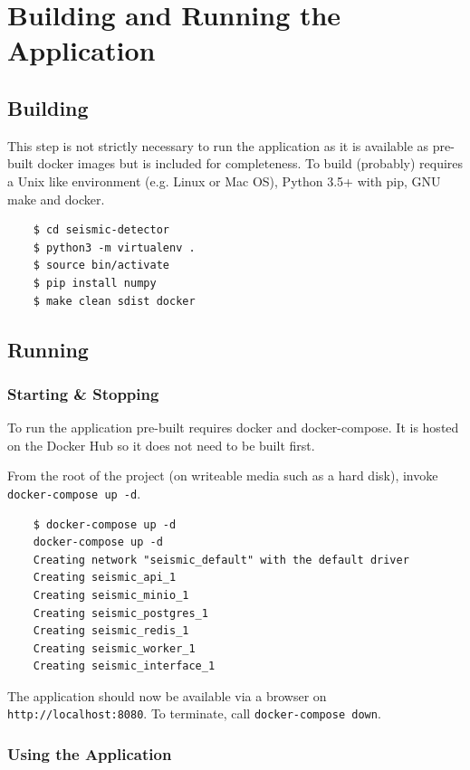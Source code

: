 \documentclass[../report.tex]{subfiles}
\begin{document}
\section{Building and Running the Application}
\subsection{Building}

	This step is not strictly necessary to run the application as it is available as pre-built docker images but is included for completeness.  To build (probably) requires a Unix like environment (e.g. Linux or Mac OS), Python 3.5+ with pip, GNU make and docker.
	
\begin{verbatim}
	$ cd seismic-detector
	$ python3 -m virtualenv .
	$ source bin/activate
	$ pip install numpy
	$ make clean sdist docker
\end{verbatim}

\subsection{Running}

\subsubsection{Starting \& Stopping} \label{sec:start-stop}

	To run the application pre-built requires docker and docker-compose.  It is hosted on the Docker Hub so it does not need to be built first.
	
	From the root of the project (on writeable media such as a hard disk), invoke \texttt{docker-compose up -d}.
	
\begin{verbatim}
	$ docker-compose up -d
	docker-compose up -d
	Creating network "seismic_default" with the default driver
	Creating seismic_api_1
	Creating seismic_minio_1
	Creating seismic_postgres_1
	Creating seismic_redis_1
	Creating seismic_worker_1
	Creating seismic_interface_1
\end{verbatim}

	The application should now be available via a browser on \texttt{http://localhost:8080}.  To terminate, call \texttt{docker-compose down}.

\newpage	
\subsubsection{Using the Application} \label{sec:using-application}
	
\end{document}
